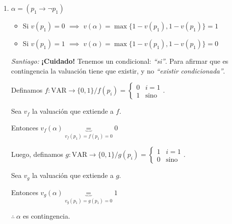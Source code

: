 \begin{enumerate}
\begin{proof}
            \begin{enumerate}[%
                            labelindent=*,
                            style=multiline,
                            leftmargin=*,
                            align=left,
                            leftmargin=2\parindent,
                            label=Caso \arabic*)]
                \item Si $v(p_1) = 1 \implies v(\alpha) = \max{\{ 1,0 \}}=1$
                \item Si $v(p_1) = 0 \implies v(\alpha) = \max{\{ 1,0 \}}=1$
            \end{enumerate}
            \begin{gather*}
                \therefore ~  v(\alpha) = 1 ~ \forall v \text{ valuación}
            \end{gather*}
        \end{proof}

    \item $\alpha = (p_1 \to \neg p_1)$
        \begin{itemize}
            \item Si $v(p_1) = 0$ $\implies$
                $v(\alpha) = \max{\{ 1 - v(p_1), 1 - v(p_1) \}} = 1$
            \item Si $v(p_1) = 1$ $\implies$
                $v(\alpha) = \max{\{ 1 - v(p_1), 1 - v(p_1) \}} = 0$
        \end{itemize}

        \textit{Santiago:} \textbf{¡Cuidado!}
        Tenemos un condicional: \textit{``si''}.
        Para afirmar que es contingencia la valuación tiene que existir,
        y no \textit{``existir condicionada''}.

        Definamos $f: \mathrm{VAR} \to \{ 0, 1 \} / f(p_i) = \begin{cases}
            0 & i = 1 \\
            1 & \text{sino}
        \end{cases}$.

        Sea $v_f$ la valuación que extiende a $f$.

        Entonces $v_f(\alpha) \underbrace{=}_{v_f(p_1) = f(p_1) = 0} 0$

        Luego, definamos
        $g: \mathrm{VAR} \to \{ 0, 1 \} / g(p_i) = \begin{cases}
            1 & i = 1 \\
            0 & \text{sino}
        \end{cases}$.

        Sea $v_g$ la valuación que extiende a $g$.

        Entonces $v_g(\alpha) \underbrace{=}_{v_g(p_1) = g(p_1) = 0} 1$

        \begin{center}
            $\therefore ~ \alpha$ es contingencia.
        \end{center}
\end{enumerate} 


